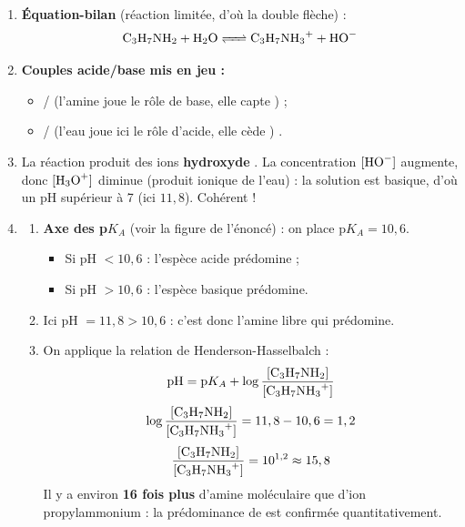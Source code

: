 \documentclass[11pt]{article}
\begin{document}
\begin{corrige}
\begin{enumerate}
\item \textbf{Équation-bilan} (réaction limitée, d'où la double flèche) : \[ \ce{C3H7NH2 + H2O <=> C3H7NH3+ + HO-} \]
\item \textbf{Couples acide/base mis en jeu :}
\begin{itemize}
\item {}/ (l'amine joue le rôle de base, elle capte ) ;
\item {}/ (l'eau joue ici le rôle d'acide, elle cède ) .
\end{itemize}
\item La réaction produit des ions \textbf{hydroxyde }. La concentration $[\ce{HO-}]$ augmente, donc $[\ce{H3O+}]$ diminue (produit ionique de l'eau) : la solution est basique, d'où un pH supérieur à 7 (ici $11,8$). Cohérent !
\item \begin{enumerate}
\item \textbf{Axe des p$K_A$} (voir la figure de l'énoncé) : on place p$K_A = 10,6$.
\begin{itemize}
\item Si pH $< 10,6$ : l'espèce acide  prédomine ;
\item Si pH $> 10,6$ : l'espèce basique  prédomine.
\end{itemize}
\item Ici pH $= 11,8 > 10,6$ : c'est donc l'amine libre \textbf{} qui prédomine.
\item On applique la relation de Henderson-Hasselbalch :
\[ \text{pH} = \text{p}K_A + \log\frac{[\ce{C3H7NH2}]}{[\ce{C3H7NH3+}]} \]
\[ \log\frac{[\ce{C3H7NH2}]}{[\ce{C3H7NH3+}]} = 11,8 - 10,6 = 1,2 \]
\[ \frac{[\ce{C3H7NH2}]}{[\ce{C3H7NH3+}]} = 10^{1,2} \approx 15,8 \]
Il y a environ \textbf{16 fois plus} d'amine moléculaire que d'ion propylammonium : la prédominance de  est confirmée quantitativement.
\end{enumerate}
\end{enumerate}
\end{corrige}
\end{document}

